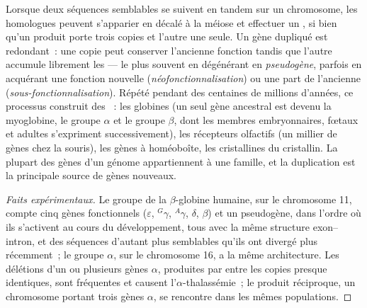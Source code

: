 \begin{proposition}\label{prop:b2:genome-diversification:duplication}
Lorsque deux séquences semblables se suivent en tandem sur un
chromosome, les homologues peuvent s'apparier en décalé à la méiose et
effectuer un , si bien qu'un produit porte trois
copies et l'autre une seule. Un gène dupliqué est redondant~: une copie
peut conserver l'ancienne fonction tandis que l'autre accumule
librement les  --- le plus souvent en dégénérant en
\emph{pseudogène}, parfois en acquérant une fonction nouvelle
(\emph{néofonctionnalisation}) ou une part de l'ancienne
(\emph{sous-fonctionnalisation}). Répété pendant des centaines de
millions d'années, ce processus construit des \emph{}~: les globines (un seul gène ancestral est devenu la
myoglobine, le groupe $\alpha$ et le groupe
$\beta$, dont les membres embryonnaires, fœtaux et adultes s'expriment
successivement), les récepteurs olfactifs (un millier de gènes chez la
souris), les gènes à homéoboîte, les cristallines du cristallin. La
plupart des gènes d'un génome appartiennent à une famille, et la
duplication est la principale source de gènes nouveaux.
\end{proposition}
\begin{proof}[Faits expérimentaux]
Le groupe de la $\beta$-globine humaine, sur le chromosome 11, compte
cinq gènes fonctionnels ($\varepsilon$, $^{G}\gamma$, $^{A}\gamma$,
$\delta$, $\beta$) et un pseudogène, dans l'ordre où ils s'activent au
cours du développement, tous avec la même structure exon--intron, et
des séquences d'autant plus semblables qu'ils ont divergé plus
récemment~; le groupe $\alpha$, sur le chromosome 16, a la même
architecture. Les délétions d'un ou plusieurs gènes $\alpha$, produites
par  entre les copies presque identiques, sont
fréquentes et causent l'$\alpha$-thalassémie~; le produit réciproque,
un chromosome portant trois gènes $\alpha$, se rencontre dans les mêmes
populations.
\end{proof}

